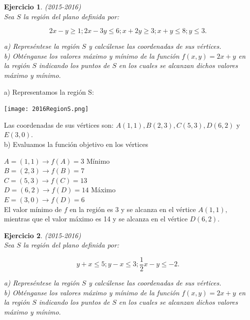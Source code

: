 \documentclass[12pt, a4paper]{amsart}
\newtheorem{ejer}{Ejercicio}
\newcommand{\s}{\color[rgb]{0,0,0.5}}
\newcommand{\n}{\color[rgb]{0,0,0}}
\begin{document}
\begin{ejer}\em (2015-2016)\\
Sea $S$ la región del plano definida por:

\[2x-y\geq 1; 2x-3y\leq 6; x+2y \geq 3; x+y\leq 8; y\leq 3.\]
\vspace*{5mm}

a) Represéntese la región $S$ y calcúlense las coordenadas de sus vértices.\\
b) Obténganse los valores máximo y mínimo de la función $f (x, y ) = 2x + y$ en la región $S$ indicando los puntos de $S$ en los cuales se alcanzan dichos valores máximo y mínimo.
\end{ejer}
\s

a) Representamos la región S:

\begin{center}
\texttt{[image: 2016RegionS.png]}
\end{center}



Las coordenadas de sus vértices son: $A(1,1), B(2,3), C(5,3), D(6,2)$ y $E(3,0).$\\

b) Evaluamos la función objetivo en los vértices
 
$A=(1,1) \rightarrow f(A)=3$ Mínimo\\

$B=(2,3) \rightarrow f(B)=7$\\

$C=(5,3) \rightarrow f(C)=13$\\

$D=(6,2) \rightarrow f(D)=14$ Máximo\\

$E=(3,0) \rightarrow f(D)=6$\\


El valor mínimo de $f$ en la región es 3 y se alcanza en el vértice $A(1,1),$ mientras que el valor máximo es 14 y se alcanza en el vértice $D(6,2).$




\n
\begin{ejer}\em (2015-2016)\\
Sea $S$ la región del plano definida por:

\[y+x\leq 5; y-x\leq 3; \frac{1}{2}x-y\leq -2.\]
\vspace*{5mm}

a) Represéntese la región $S$ y calcúlense las coordenadas de sus vértices.\\
b) Obténganse los valores máximo y mínimo de la función $f (x, y ) = 2x + y$ en la región $S$ indicando los puntos de $S$ en los cuales se alcanzan dichos valores máximo y mínimo.
\end{ejer}
\s
\end{document}
